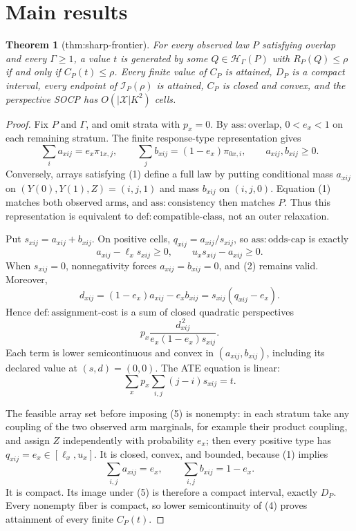 \documentclass{article}
\newtheorem{theorem}{Theorem}
\begin{document}
\section{Main results}

\begin{theorem}[thm:sharp-frontier]\label{thm:sharp-frontier}
For every observed law \(P\) satisfying overlap and every \(\Gamma\geq1\), a value \(t\) is generated by some \(Q\in\mathcal H_\Gamma(P)\) with \(R_P(Q)\leq\rho\) if and only if \(C_P(t)\leq\rho\). Every finite value of \(C_P\) is attained, \(D_P\) is a compact interval, every endpoint of \(\mathcal I_P(\rho)\) is attained, \(C_P\) is closed and convex, and the perspective SOCP has \(O(|\mathcal X|K^2)\) cells.
\end{theorem}
\begin{proof}
Fix \(P\) and \(\Gamma\), and omit strata with \(p_x=0\). By \(\mathrm{ass{:}overlap}\), \(0<e_x<1\) on each remaining stratum. The finite response-type representation gives
\[
\sum_i a_{xij}=e_x\pi_{1x,j},\qquad
\sum_j b_{xij}=(1-e_x)\pi_{0x,i},\qquad a_{xij},b_{xij}\geq0. \tag{1}
\]
Conversely, arrays satisfying (1) define a full law by putting conditional mass \(a_{xij}\) on \((Y(0),Y(1),Z)=(i,j,1)\) and mass \(b_{xij}\) on \((i,j,0)\). Equation (1) matches both observed arms, and \(\mathrm{ass{:}consistency}\) then matches \(P\). Thus this representation is equivalent to \(\mathrm{def{:}compatible\mbox{-}class}\), not an outer relaxation.

Put \(s_{xij}=a_{xij}+b_{xij}\). On positive cells, \(q_{xij}=a_{xij}/s_{xij}\), so \(\mathrm{ass{:}odds\mbox{-}cap}\) is exactly
\[
a_{xij}-\ell_xs_{xij}\geq0,\qquad u_xs_{xij}-a_{xij}\geq0. \tag{2}
\]
When \(s_{xij}=0\), nonnegativity forces \(a_{xij}=b_{xij}=0\), and (2) remains valid. Moreover,
\[
d_{xij}=(1-e_x)a_{xij}-e_xb_{xij}=s_{xij}(q_{xij}-e_x). \tag{3}
\]
Hence \(\mathrm{def{:}assignment\mbox{-}cost}\) is a sum of closed quadratic perspectives
\[
p_x\frac{d_{xij}^{\,2}}{e_x(1-e_x)s_{xij}}. \tag{4}
\]
Each term is lower semicontinuous and convex in \((a_{xij},b_{xij})\), including its declared value at \((s,d)=(0,0)\). The ATE equation is linear:
\[
\sum_xp_x\sum_{i,j}(j-i)s_{xij}=t. \tag{5}
\]

The feasible array set before imposing (5) is nonempty: in each stratum take any coupling of the two observed arm marginals, for example their product coupling, and assign \(Z\) independently with probability \(e_x\); then every positive type has \(q_{xij}=e_x\in[\ell_x,u_x]\). It is closed, convex, and bounded, because (1) implies
\[
\sum_{i,j}a_{xij}=e_x,\qquad \sum_{i,j}b_{xij}=1-e_x.
\]
It is compact. Its image under (5) is therefore a compact interval, exactly \(D_P\). Every nonempty fiber is compact, so lower semicontinuity of (4) proves attainment of every finite \(C_P(t)\).


\end{proof}
\end{document}
